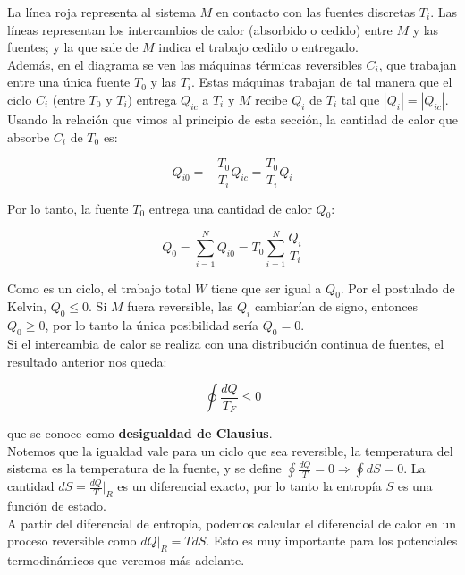 \documentclass[a4paper]{article}
\begin{document}
La l\'inea roja representa al sistema $M$ en contacto con las fuentes discretas $T_{i}$. Las l\'ineas representan los intercambios de calor (absorbido o cedido) entre $M$ y las fuentes; y la que sale de $M$ indica el trabajo cedido o entregado. \\

Adem\'as, en el diagrama se ven las m\'aquinas t\'ermicas reversibles $C_{i}$, que trabajan entre una \'unica fuente $T_{0}$ y las $T_{i}$. Estas m\'aquinas trabajan de tal manera que el ciclo $C_{i}$ (entre $T_{0}$ y $T_{i}$) entrega $Q_{ic}$ a $T_{i}$ y $M$ recibe $Q_{i}$ de $T_{i}$ tal que $|Q_{i}| = |Q_{ic}|$.\\

Usando la relaci\'on que vimos al principio de esta secci\'on, la cantidad de calor que absorbe $C_{i}$ de $T_{0}$ es:

$$ Q_{i0} = -\frac{T_{0}}{T_{i}}Q_{ic} = \frac{T_{0}}{T_{i}}Q_{i} $$

Por lo tanto, la fuente $T_{0}$ entrega una cantidad de calor $Q_{0}$:

$$Q_{0} = \sum_{i = 1}^{N} Q_{i0} = T_{0} \sum_{i = 1}^{N}\frac{Q_{i}}{T_{i}}$$

Como es un ciclo, el trabajo total $W$ tiene que ser igual a $Q_{0}$. Por el postulado de Kelvin, $Q_{0} \leq 0$. Si $M$ fuera reversible, las $Q_{i}$ cambiar\'ian de signo, entonces $Q_{0} \geq 0$, por lo tanto la \'unica posibilidad ser\'ia $Q_{0} = 0$.\\

Si el intercambia de calor se realiza con una distribuci\'on continua de fuentes, el resultado anterior nos queda:

\begin{equation}
\label{eq:clausius}
\oint \frac{dQ}{T_{F}} \leq 0
\end{equation}

que se conoce como \textbf{desigualdad de Clausius}.\\

Notemos que la igualdad vale para un ciclo que sea reversible, la temperatura del sistema es la temperatura de la fuente, y se define $\oint \frac{dQ}{T} = 0 \Rightarrow \oint dS = 0$. La cantidad $dS = \frac{dQ}{T}\bigg|_{R}$ es un diferencial exacto, por lo tanto la entrop\'ia $S$ es una funci\'on de estado.\\

A partir del diferencial de entrop\'ia, podemos calcular el diferencial de calor en un proceso reversible como $dQ|_{R} = TdS$. Esto es muy importante para los potenciales termodin\'amicos que veremos m\'as adelante.\\
\end{document}
